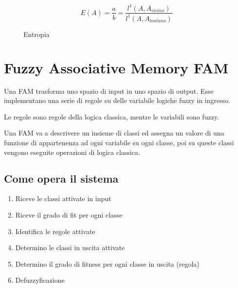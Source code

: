 \documentclass[\main/main.tex]{subfiles}
\begin{document}
\begin{figure}[H]
	\[
		E(A) = \dfrac{a}{b} = \dfrac{l^1(A, A_{vicino})}{l^1(A, A_{lontano})}
	\]
	\caption{Entropia}
\end{figure}

\section{Fuzzy Associative Memory FAM}
Una FAM trasforma uno spazio di input in uno spazio di output. Esse implementano una serie di regole su delle variabile logiche fuzzy in ingresso.

Le regole sono regole della logica classica, mentre le variabili sono fuzzy.

Una FAM va a descrivere un insieme di classi ed assegna un valore di una funzione di appartenenza ad ogni variabile su ogni classe, poi su queste classi vengono eseguite operazioni di logica classica.

\subsection{Come opera il sistema}

\begin{enumerate}
	\item Riceve le classi attivate in input
	\item Riceve il grado di fit per ogni classe
	\item Identifica le regole attivate
	\item Determino le classi in uscita attivate
	\item Determino il grado di fitness per ogni classe in uscita (regola)
	\item Defuzzyficazione
\end{enumerate}
\end{document}
